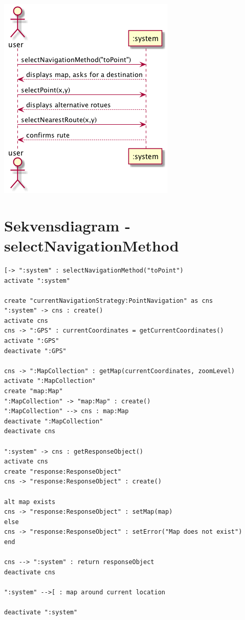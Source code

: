 \documentclass[10pt,a4paper]{article}
\begin{document}
\begin{center}
\includegraphics[width=.9\linewidth]{robot-ssd.png}
\end{center}

\section{Sekvensdiagram - selectNavigationMethod}
\label{sec:org4dcb6dd}
\begin{verbatim}
[-> ":system" : selectNavigationMethod("toPoint")
activate ":system"

create "currentNavigationStrategy:PointNavigation" as cns
":system" -> cns : create()
activate cns
cns -> ":GPS" : currentCoordinates = getCurrentCoordinates()
activate ":GPS"
deactivate ":GPS"

cns -> ":MapCollection" : getMap(currentCoordinates, zoomLevel)
activate ":MapCollection"
create "map:Map"
":MapCollection" -> "map:Map" : create()
":MapCollection" --> cns : map:Map
deactivate ":MapCollection"
deactivate cns

":system" -> cns : getResponseObject()
activate cns
create "response:ResponseObject"
cns -> "response:ResponseObject" : create()

alt map exists
cns -> "response:ResponseObject" : setMap(map)
else
cns -> "response:ResponseObject" : setError("Map does not exist")
end

cns --> ":system" : return responseObject
deactivate cns

":system" -->[ : map around current location

deactivate ":system"

\end{verbatim}
\end{document}
